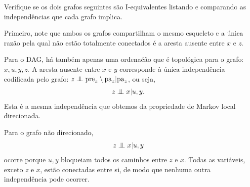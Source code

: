 
\begin{exenumerate}
    \item Verifique se os dois grafos seguintes s\~ao I-equivalentes listando e comparando as independ\^encias que cada grafo implica.
    
    \begin{center}
    \end{center}
    
    \begin{solution}
        Primeiro, note que ambos os grafos compartilham o mesmo esqueleto e a \'unica raz\~ao pela qual n\~ao est\~ao totalmente conectados \'e a aresta ausente entre $x$ e $z$.
        
        Para o DAG, h\'a tamb\'em apenas uma ordena\'c\~ao que \'e topol\'ogica para o grafo: $x, u, y, z$. A aresta ausente entre $x$ e $y$ corresponde \`a \'unica independ\^encia codificada pelo grafo: $z \mathrel{\perp\mspace{-10mu}\perp} \mathrm{pre}_z \setminus \mathrm{pa}_z | \mathrm{pa}_z$, ou seja,
        $$z \mathrel{\perp\mspace{-10mu}\perp} x | u, y.$$ Esta \'e a mesma independ\^encia que obtemos da propriedade de Markov local direcionada.
        
        Para o grafo n\~ao direcionado, 
        $$z \mathrel{\perp\mspace{-10mu}\perp} x | u, y$$ ocorre porque $u, y$ bloqueiam todos os caminhos entre $z$ e $x$. Todas as vari\'aveis, exceto $z$ e $x$, est\~ao conectadas entre si, de modo que nenhuma outra independ\^encia pode ocorrer.
        

\end{solution}
\end{exenumerate}
